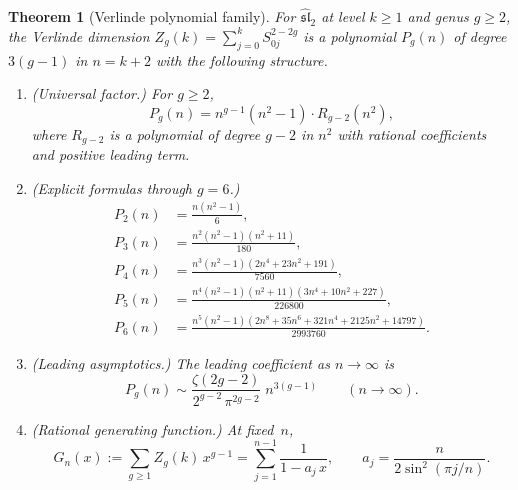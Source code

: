 \documentclass[11pt,reqno]{amsart}
\newtheorem{theorem}{Theorem}[section]
\theoremstyle{definition}
\theoremstyle{remark}
\providecommand{\fsl}{\mathfrak{sl}}
\numberwithin{equation}{section}
\begin{document}
\begin{theorem}[Verlinde polynomial family]
  \label{thm:verlinde-polynomial}
  For $\widehat{\fsl}_2$ at level $k \ge 1$ and genus $g\ge2$, the Verlinde
  dimension $Z_g(k) = \sum_{j=0}^{k} S_{0j}^{2-2g}$ is a
  polynomial $P_g(n)$ of degree $3(g-1)$ in $n = k+2$ with the
  following structure.
  \begin{enumerate}[label=\textup{(\roman*)}]
  \item \textup{(Universal factor.)} For $g \ge 2$,
    \begin{equation}\label{eq:verlinde-factor}
      P_g(n) = n^{g-1}(n^2 - 1) \cdot R_{g-2}(n^2),
    \end{equation}
    where $R_{g-2}$ is a polynomial of degree $g - 2$ in $n^2$
    with rational coefficients and positive leading term.
  \item \textup{(Explicit formulas through $g = 6$.)}
    \begin{align}
      P_2(n) &= \frac{n(n^2 - 1)}{6},
        \label{eq:P2} \\
      P_3(n) &= \frac{n^2(n^2 - 1)(n^2 + 11)}{180},
        \label{eq:P3} \\
      P_4(n) &= \frac{n^3(n^2 - 1)(2n^4 + 23n^2 + 191)}{7560},
        \label{eq:P4} \\
      P_5(n) &= \frac{n^4(n^2 - 1)(n^2 + 11)
        (3n^4 + 10n^2 + 227)}{226800},
        \label{eq:P5} \\
      P_6(n) &= \frac{n^5(n^2 - 1)(2n^8 + 35n^6
        + 321n^4 + 2125n^2 + 14797)}{2993760}.
        \label{eq:P6}
    \end{align}
  \item \textup{(Leading asymptotics.)} The leading coefficient
    as $n \to \infty$ is
    \begin{equation}\label{eq:verlinde-leading}
      P_g(n) \sim
      \frac{\zeta(2g - 2)}{2^{g-2}\,\pi^{2g-2}}\;
      n^{3(g-1)}
      \qquad (n \to \infty).
    \end{equation}
  \item \textup{(Rational generating function.)} At fixed~$n$,
    \begin{equation}\label{eq:verlinde-gf}
      G_n(x) := \sum_{g \ge 1} Z_g(k)\, x^{g-1}
      = \sum_{j=1}^{n-1}
      \frac{1}{1 - a_j\, x},
      \qquad
      a_j = \frac{n}{2\sin^2(\pi j/n)}.
    \end{equation}
  \end{enumerate}
\end{theorem}
\end{document}
